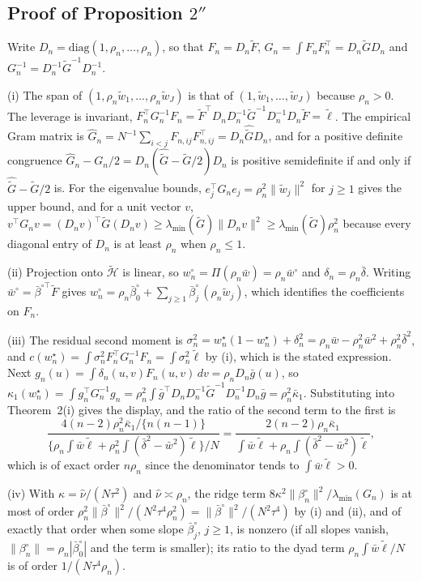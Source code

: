 \documentclass[12pt]{article}
\newcommand{\calH}{\mathcal{H}}
\newcommand{\norm}[1]{\|#1\|}
\newcommand{\wstar}{w^{\star}}
\begin{document}
\subsection*{Proof of Proposition $2''$}
Write $D_n=\mathrm{diag}(1,\rho_n,\dots,\rho_n)$, so that $F_n=D_n\tilde F$, $G_n=\int F_nF_n^{\top}=D_n\tilde GD_n$ and $G_n^{-1}=D_n^{-1}\tilde G^{-1}D_n^{-1}$.

(i) The span of $(1,\rho_n\tilde w_1,\dots,\rho_n\tilde w_J)$ is that of $(1,\tilde w_1,\dots,\tilde w_J)$ because $\rho_n>0$. The leverage is invariant, $F_n^{\top}G_n^{-1}F_n=\tilde F^{\top}D_nD_n^{-1}\tilde G^{-1}D_n^{-1}D_n\tilde F=\tilde\ell$. The empirical Gram matrix is $\hat G_n=N^{-1}\sum_{i<j}F_{n,ij}F_{n,ij}^{\top}=D_n\hat{\tilde G}D_n$, and for a positive definite congruence $\hat G_n-G_n/2=D_n(\hat{\tilde G}-\tilde G/2)D_n$ is positive semidefinite if and only if $\hat{\tilde G}-\tilde G/2$ is. For the eigenvalue bounds, $e_j^{\top}G_ne_j=\rho_n^2\norm{\tilde w_j}^2$ for $j\ge1$ gives the upper bound, and for a unit vector $v$, $v^{\top}G_nv=(D_nv)^{\top}\tilde G(D_nv)\ge\lambda_{\min}(\tilde G)\norm{D_nv}^2\ge\lambda_{\min}(\tilde G)\rho_n^2$ because every diagonal entry of $D_n$ is at least $\rho_n$ when $\rho_n\le1$.

(ii) Projection onto $\tilde{\calH}$ is linear, so $w^{\circ}_n=\Pi(\rho_n\bar w)=\rho_n\bar w^{\circ}$ and $\delta_n=\rho_n\bar\delta$. Writing $\bar w^{\circ}=\bar\beta^{\circ\top}\tilde F$ gives $w^{\circ}_n=\rho_n\bar\beta^{\circ}_0+\sum_{j\ge1}\bar\beta^{\circ}_j\,(\rho_n\tilde w_j)$, which identifies the coefficients on $F_n$.

(iii) The residual second moment is $\sigma_n^2=\wstar_n(1-\wstar_n)+\delta_n^2=\rho_n\bar w-\rho_n^2\bar w^2+\rho_n^2\bar\delta^2$, and $c(\wstar_n)=\int\sigma_n^2F_n^{\top}G_n^{-1}F_n=\int\sigma_n^2\tilde\ell$ by (i), which is the stated expression. Next $g_n(u)=\int\delta_n(u,v)F_n(u,v)\,dv=\rho_nD_n\bar g(u)$, so $\kappa_1(\wstar_n)=\int g_n^{\top}G_n^{-1}g_n=\rho_n^2\int\bar g^{\top}D_nD_n^{-1}\tilde G^{-1}D_n^{-1}D_n\bar g=\rho_n^2\bar\kappa_1$. Substituting into Theorem~2(i) gives the display, and the ratio of the second term to the first is
\[
\frac{4(n-2)\rho_n^2\bar\kappa_1/\{n(n-1)\}}{\{\rho_n\int\bar w\tilde\ell+\rho_n^2\int(\bar\delta^2-\bar w^2)\tilde\ell\}/N}=\frac{2(n-2)\rho_n\bar\kappa_1}{\int\bar w\tilde\ell+\rho_n\int(\bar\delta^2-\bar w^2)\tilde\ell},
\]
which is of exact order $n\rho_n$ since the denominator tends to $\int\bar w\tilde\ell>0$.

(iv) With $\kappa=\hat\nu/(N\tau^2)$ and $\hat\nu\asymp\rho_n$, the ridge term $8\kappa^2\norm{\beta^{\circ}_n}^2/\lambda_{\min}(G_n)$ is at most of order $\rho_n^2\norm{\bar\beta^{\circ}}^2/(N^2\tau^4\rho_n^2)=\norm{\bar\beta^{\circ}}^2/(N^2\tau^4)$ by (i) and (ii), and of exactly that order when some slope $\bar\beta^{\circ}_j$, $j\ge1$, is nonzero (if all slopes vanish, $\norm{\beta^{\circ}_n}=\rho_n|\bar\beta^{\circ}_0|$ and the term is smaller); its ratio to the dyad term $\rho_n\int\bar w\tilde\ell/N$ is of order $1/(N\tau^4\rho_n)$.
\end{document}

